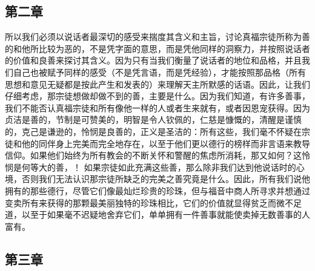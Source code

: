 
\subsection{第二章}

\par

所以我们必须以说话者最深切的感受来揣度其含义和主旨，讨论真福宗徒所称为善的和他所比较为恶的，不是凭字面的意思，而是凭他同样的洞察力，并按照说话者的价值和良善来探讨其含义。因为只有当我们衡量了说话者的地位和品格，并且我们自己也被赋予同样的感受（不是凭言语，而是凭经验），才能按照那品格（所有思想和意见无疑都是按此产生和发表的）来理解天主所默感的话语。因此，让我们仔细考虑，那宗徒想做却做不到的善，主要是什么。因为我们知道，有许多善事，我们不能否认真福宗徒和所有像他一样的人或者生来就有，或者因恩宠获得。因为贞洁是善的，节制是可赞美的，明智是令人钦佩的，仁慈是慷慨的，清醒是谨慎的，克己是谦逊的，怜悯是良善的，正义是圣洁的：所有这些，我们毫不怀疑在宗徒和他的同伴身上完美而完全地存在，以至于他们更以德行的榜样而非言语来教导信仰。如果他们始终为所有教会的不断关怀和警醒的焦虑所消耗，那又如何？这怜悯是何等大的善，！ 如果宗徒如此充满这些善，那么除非我们达到他说话时的心境，否则我们无法认识那宗徒所缺乏的完美之善究竟是什么。因此，所有我们说他拥有的那些德行，尽管它们像最灿烂珍贵的珍珠，但与福音中商人所寻求并想通过变卖所有来获得的那颗最美丽独特的珍珠相比，它们的价值就显得贫乏而微不足道，以至于如果毫不迟疑地舍弃它们，单单拥有一件善事就能使卖掉无数善事的人富有。\par


\subsection{第三章}

\par

